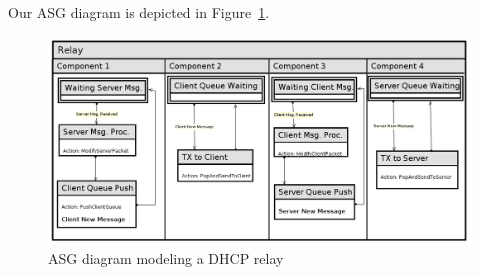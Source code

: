 Our ASG diagram is depicted in Figure~\ref{fig:asg}.

\begin{figure}[h]
	\centering\includegraphics[scale=0.4]{images/asg-diagram}
	\caption{ASG diagram modeling a DHCP relay}
	\label{fig:asg}
\end{figure}


